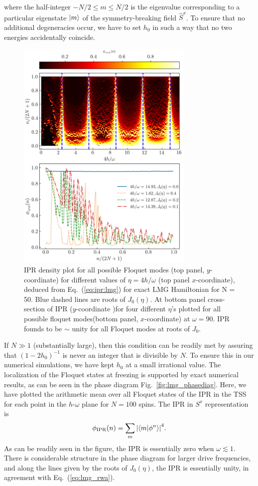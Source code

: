 \documentclass[%
reprint,
superscriptaddress,
amsmath,amssymb,
aps,
prb,
showkeys,
]{revtex4-2}
\begin{document}
where the half-integer $-N/2\leq m \leq N/2$ is the eigenvalue corresponding to a particular eigenstate $\ket{m}$ of the symmetry-breaking field $\hat{S}^x$. To ensure that no additional degeneracies occur, we have to set $h_0$ in  such a way that no two energies accidentally coincide.
\begin{figure}[t!]
	\centering
	\includegraphics[width = 8.5cm]{figure_5.jpeg}
	\caption{IPR density plot for all possible Floquet modes (top panel, $y$-coordinate) for different values of $\eta = 4h/\omega$ (top panel $x$-coordinate), deduced from Eq.~(\ref{eq:ipr:lmg}) for exact LMG Hamiltonian for N = 50. Blue dashed lines are roots of $J_0(\eta)$. At bottom panel cross-section of IPR ($y$-coordinate )for four different $\eta$'s plotted for all possible floquet modes(bottom panel, $x$-coordinate) at $\omega=90$. IPR founds to be $\sim$ unity for all Floquet modes at roots of $J_0$.}
	\label{fig:lmg_ipr_exact}
\end{figure}
If $N\gg 1$ (substantially large), then this condition can be readily met by assuring that $(1-2h_0)^{-1}$ is never an integer that is divisible by $N$. To ensure this in our numerical simulations, we have kept $h_0$ at a small irrational value.
The localization of the Floquet states at freezing is supported by exact numerical results, as can be seen in the phase diagram Fig.~\ref{fig:lmg_phasediag}. Here, we have plotted the arithmetic mean over all Floquet states of the IPR 
in the TSS for each point in the $h$-$\omega$ plane for $N=100$ spins.  The IPR in $S^x$ representation is
\begin{equation}
	\phi_\mathrm{IPR}(n) = \sum_m \abs{\ip{m}{\phi^n}}^4.
	\label{eq:ipr:lmg}
\end{equation}
As can be readily seen in the figure, the IPR is essentially zero when  $\omega \lesssim 1$. There is considerable structure in the phase diagram for larger drive frequencies, and along the lines given by the roots of $J_0(\eta)$, the IPR is essentially unity, in agreement with Eq.~(\ref{eq:lmg_rwa}).
\end{document}

